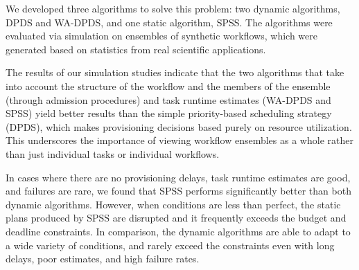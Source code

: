 \documentclass[conference]{IEEEtran}
\begin{document}

We developed three algorithms to solve this problem: two dynamic algorithms,
DPDS and WA-DPDS, and one static algorithm, SPSS. The algorithms were
evaluated via simulation on ensembles of synthetic workflows, which were
generated based on statistics from real scientific applications.

The results of our simulation studies indicate that the two algorithms that
take into account the structure of the workflow 
and the members of the ensemble (through admission procedures) and task runtime estimates
(WA-DPDS and SPSS) yield better results than the simple priority-based
scheduling strategy (DPDS), which makes provisioning decisions based purely on
resource utilization.  This underscores the importance of viewing workflow ensembles as a whole rather than just individual tasks or individual workflows.

In cases where there are no provisioning delays, task runtime estimates are
good, and failures are rare, we found that SPSS
performs significantly better than both dynamic algorithms. However, when
conditions are less than perfect, the static plans produced by SPSS are
disrupted and it frequently exceeds the budget and deadline constraints. In
comparison, the dynamic algorithms are able to adapt to a wide variety of
conditions, and rarely exceed the constraints even with long delays, poor
estimates, and high failure rates.

\end{document}
